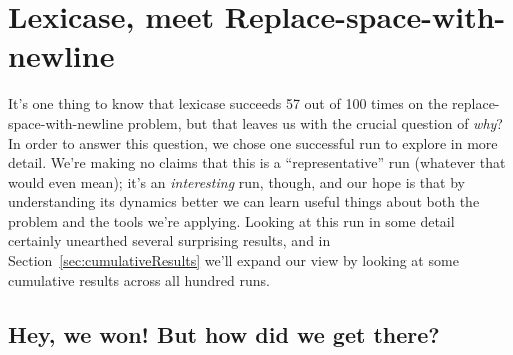 \section{Lexicase, meet Replace-space-with-newline}
\label{sec:lexicaseRun}


It's one thing to know that lexicase succeeds 57 out of 100 times on the replace-space-with-newline problem, but that
leaves us with the crucial question of \emph{why}? In order to answer this question, we chose one successful 
run to explore in more detail.
We're making no claims that this is a ``representative'' run (whatever that would even
mean); it's an \emph{interesting} run, though, and our hope is that by understanding its dynamics
better we can learn useful things about both the problem and the tools we're applying. Looking at this run in some
detail certainly unearthed several surprising results, and in Section~\ref{sec:cumulativeResults}
we'll expand our view by looking at some cumulative results across all hundred runs.

\subsection{Hey, we won! But how did we get there?}

